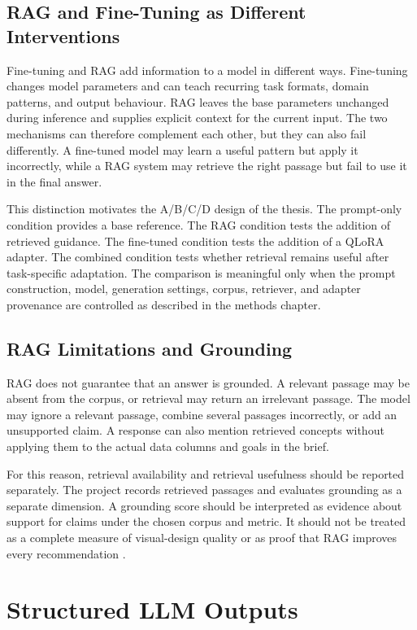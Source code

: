 \subsection{RAG and Fine-Tuning as Different Interventions}

Fine-tuning and RAG add information to a model in different ways. Fine-tuning changes model parameters and can teach recurring task formats, domain patterns, and output behaviour. RAG leaves the base parameters unchanged during inference and supplies explicit context for the current input. The two mechanisms can therefore complement each other, but they can also fail differently. A fine-tuned model may learn a useful pattern but apply it incorrectly, while a RAG system may retrieve the right passage but fail to use it in the final answer.

This distinction motivates the A/B/C/D design of the thesis. The prompt-only condition provides a base reference. The RAG condition tests the addition of retrieved guidance. The fine-tuned condition tests the addition of a QLoRA adapter. The combined condition tests whether retrieval remains useful after task-specific adaptation. The comparison is meaningful only when the prompt construction, model, generation settings, corpus, retriever, and adapter provenance are controlled as described in the methods chapter.

\subsection{RAG Limitations and Grounding}

RAG does not guarantee that an answer is grounded. A relevant passage may be absent from the corpus, or retrieval may return an irrelevant passage. The model may ignore a relevant passage, combine several passages incorrectly, or add an unsupported claim. A response can also mention retrieved concepts without applying them to the actual data columns and goals in the brief.

For this reason, retrieval availability and retrieval usefulness should be reported separately. The project records retrieved passages and evaluates grounding as a separate dimension. A grounding score should be interpreted as evidence about support for claims under the chosen corpus and metric. It should not be treated as a complete measure of visual-design quality or as proof that RAG improves every recommendation \cite{lewis2020rag}.

\section{Structured LLM Outputs}

